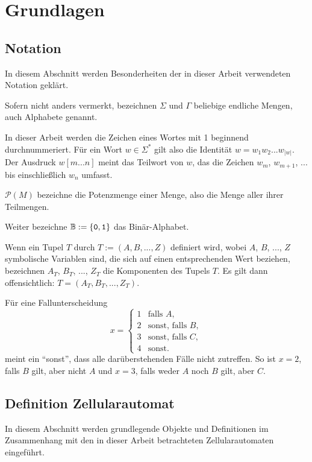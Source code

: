\chapter{Grundlagen}
\label{chap:Grundlagen}

\section{Notation}

In diesem Abschnitt werden Besonderheiten der in dieser Arbeit verwendeten Notation geklärt.

Sofern nicht anders vermerkt, bezeichnen $\Sigma$ und $\Gamma$ beliebige endliche Mengen, auch Alphabete genannt.

In dieser Arbeit werden die Zeichen eines Wortes mit 1 beginnend durchnummeriert.
Für ein Wort $w \in \Sigma^*$ gilt also die Identität $w = w_1w_2...w_{|w|}$.
Der Ausdruck $w[m...n]$ meint das Teilwort von $w$, das die Zeichen $w_m$, $w_{m+1}$, ... bis einschließlich $w_n$ umfasst.

$\mathcal{P}(M)$ bezeichne die Potenzmenge einer Menge, also die Menge aller ihrer Teilmengen.

Weiter bezeichne $\mathbb{B} := \{ { \texttt{0}, \texttt{1}} \}$ das Binär-Alphabet.

Wenn ein Tupel $T$ durch $T := (A, B, ..., Z)$ definiert wird, wobei $A$, $B$, ..., $Z$ symbolische Variablen sind,
die sich auf einen entsprechenden Wert beziehen,
bezeichnen $A_T$, $B_T$, ..., $Z_T$ die Komponenten des Tupels $T$. Es gilt dann offensichtlich: $T = (A_T, B_T, ..., Z_T)$.

Für eine Fallunterscheidung
\[
    x = \begin{cases}
        1 & \text{falls } A, \\
        2 & \text{sonst, falls } B, \\
        3 & \text{sonst, falls } C, \\
        4 & \text{sonst.}
    \end{cases}
\]
meint ein \enquote{sonst}, dass alle darüberstehenden Fälle nicht zutreffen.
So ist $x = 2$, falls $B$ gilt, aber nicht $A$ und $x = 3$, falls weder $A$ noch $B$ gilt, aber $C$.

\section{Definition Zellularautomat}

In diesem Abschnitt werden grundlegende Objekte und Definitionen im Zusammenhang mit den in dieser Arbeit betrachteten Zellularautomaten eingeführt.

